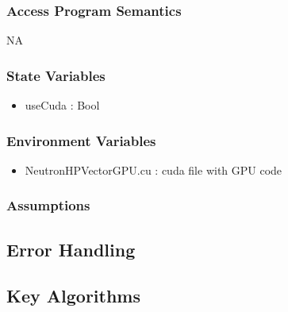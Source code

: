 \documentclass[12pt]{article}
\begin{document}
\subsubsection{Access Program Semantics}%
NA

\subsubsection{State Variables}%
\begin{itemize}
\item useCuda : Bool
\end{itemize}

\subsubsection{Environment Variables}%
\begin{itemize}
\item NeutronHPVectorGPU.cu : cuda file with GPU code
\end{itemize}


\subsubsection{Assumptions}%

\subsection{Error Handling}

\subsection{Key Algorithms}
\end{document}
